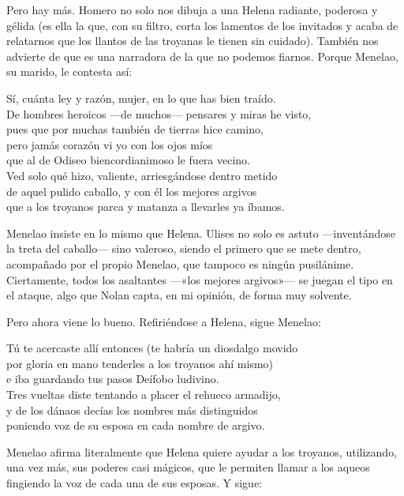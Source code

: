 Pero hay más. Homero no solo nos dibuja a una Helena radiante, poderosa y gélida (es ella la que, con su filtro, corta los lamentos de los invitados y acaba de relatarnos que los llantos de las troyanas le tienen sin cuidado). También nos advierte de que es una narradora de la que no podemos fiarnos. Porque Menelao, su marido, le contesta así:

\begin{versocita}
Sí, cuánta ley y razón, mujer, en lo que has bien traído.\\
De hombres heroicos ---de muchos--- pensares y miras he visto,\\
pues que por muchas también de tierras hice camino,\\
pero jamás corazón vi yo con los ojos míos\\
que al de Odiseo biencordianimoso le fuera vecino.\\
Ved solo qué hizo, valiente, arriesgándose dentro metido\\
de aquel pulido caballo, y con él los mejores argivos\\
que a los troyanos parca y matanza a llevarles ya íbamos.
\end{versocita}

Menelao insiste en lo mismo que Helena. Ulises no solo es astuto ---inventándose la treta del caballo--- sino valeroso, siendo el primero que se mete dentro, acompañado por el propio Menelao, que tampoco es ningún pusilánime. Ciertamente, todos los asaltantes ---«los mejores argivos»--- se juegan el tipo en el ataque, algo que Nolan capta, en mi opinión, de forma muy solvente.

Pero ahora viene lo bueno. Refiriéndose a Helena, sigue Menelao:

\begin{versocita}
Tú te acercaste allí entonces (te habría un diosdalgo movido\\
por gloria en mano tenderles a los troyanos ahí mismo)\\
e iba guardando tus pasos Deífobo ludivino.\\
Tres vueltas diste tentando a placer el rehueco armadijo,\\
y de los dánaos decías los nombres más distinguidos\\
poniendo voz de su esposa en cada nombre de argivo.
\end{versocita}

Menelao afirma literalmente que Helena quiere ayudar a los troyanos, utilizando, una vez más, sus poderes casi mágicos, que le permiten llamar a los aqueos fingiendo la voz de cada una de sus esposas. Y sigue:

